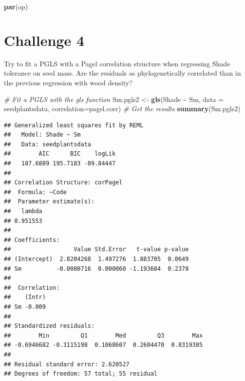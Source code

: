\documentclass[
]{book}
\newenvironment{Shaded}{\begin{snugshade}}{\end{snugshade}}
\newcommand{\AttributeTok}[1]{\textcolor[rgb]{0.13,0.29,0.53}{#1}}
\newcommand{\CommentTok}[1]{\textcolor[rgb]{0.56,0.35,0.01}{\textit{#1}}}
\newcommand{\FunctionTok}[1]{\textcolor[rgb]{0.13,0.29,0.53}{\textbf{#1}}}
\newcommand{\NormalTok}[1]{#1}
\newcommand{\OtherTok}[1]{\textcolor[rgb]{0.56,0.35,0.01}{#1}}
\newcommand{\SpecialCharTok}[1]{\textcolor[rgb]{0.81,0.36,0.00}{\textbf{#1}}}
\begin{document}
\begin{Shaded}
\begin{Highlighting}[]
\FunctionTok{par}\NormalTok{(op)}
\end{Highlighting}
\end{Shaded}

\section{Challenge 4}\label{challenge-4-1}

Try to fit a PGLS with a Pagel correlation structure when regressing Shade tolerance on seed mass. Are the residuals as phylogenetically correlated than in the previous regression with wood density?

\begin{Shaded}
\begin{Highlighting}[]
\CommentTok{\# Fit a PGLS with the gls function}
\NormalTok{Sm.pgls2 }\OtherTok{\textless{}{-}} \FunctionTok{gls}\NormalTok{(Shade }\SpecialCharTok{\textasciitilde{}}\NormalTok{ Sm, }\AttributeTok{data =}\NormalTok{ seedplantsdata, }\AttributeTok{correlation=}\NormalTok{pagel.corr)}
\CommentTok{\# Get the results}
\FunctionTok{summary}\NormalTok{(Sm.pgls2)}
\end{Highlighting}
\end{Shaded}

\begin{verbatim}
## Generalized least squares fit by REML
##   Model: Shade ~ Sm 
##   Data: seedplantsdata 
##        AIC      BIC    logLik
##   187.6889 195.7183 -89.84447
## 
## Correlation Structure: corPagel
##  Formula: ~Code 
##  Parameter estimate(s):
##   lambda 
## 0.951553 
## 
## Coefficients:
##                  Value Std.Error   t-value p-value
## (Intercept)  2.8204268  1.497276  1.883705  0.0649
## Sm          -0.0000716  0.000060 -1.193604  0.2378
## 
##  Correlation: 
##    (Intr)
## Sm -0.009
## 
## Standardized residuals:
##        Min         Q1        Med         Q3        Max 
## -0.6946682 -0.3115198  0.1068607  0.2604470  0.8319385 
## 
## Residual standard error: 2.620527 
## Degrees of freedom: 57 total; 55 residual
\end{verbatim}

  
\end{document}
